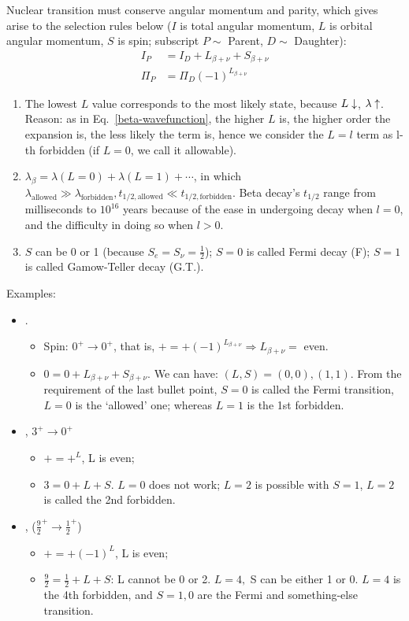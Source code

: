 \documentclass{school-22.101-notes}
\begin{document}
Nuclear transition must conserve angular momentum and parity, which gives arise to the selection rules below ($I$ is total angular momentum, $L$ is orbital angular momentum, $S$ is spin; subscript $P \sim$ Parent, $D \sim$ Daughter):
\begin{align}
I_P &= I_D + L_{\beta + \nu} + S_{\beta +\nu} \\
\Pi_P &= \Pi_D (-1)^{L_{\beta + \nu}}
\end{align}
\begin{enumerate}
\item The lowest $L$ value corresponds to the most likely state, because $L \downarrow$, $\lambda \uparrow$. Reason: as in Eq.~\ref{beta-wavefunction}, the higher $L$ is, the higher order the expansion is, the less likely the term is, hence we consider the $L=l$ term as l-th forbidden (if $L=0$, we call it allowable). 
\item $\lambda_{\beta} = \lambda (L=0) + \lambda (L=1) + \cdots$, in which $\lambda_{\mathrm{allowed}} \gg \lambda_{\mathrm{forbidden}}, t_{1/2,\mathrm{allowed}} \ll t_{1/2,\mathrm{forbidden}}$. Beta decay's $t_{1/2}$ range from milliseconds to $10^{16}$ years because of the ease in undergoing decay when $l=0$, and the difficulty in doing so when $l>0$. 
\item $S$ can be 0 or 1 (because $S_e = S_{\nu} = \frac{1}{2}$); $S = 0$ is called Fermi decay (F); $S=1$ is called Gamow-Teller decay (G.T.).
\end{enumerate}
Examples:
\begin{itemize} 
\item {}. 
    \begin{itemize} 
    \item Spin: $0^+ \to 0^+$, that is, $+ = + (-1)^{L_{\beta + \nu}} \Rightarrow L_{\beta + \nu} = $ even. 
    \item $ 0 = 0 + L_{\beta + \nu}+ S_{\beta + \nu}$. We can have: $(L, S) = (0,0), (1,1)$. From the requirement of the last bullet point, $S=0$ is called the Fermi transition, $L=0$ is the `allowed' one; whereas $L=1$ is the 1st forbidden.  
    \end{itemize}
\item {}, $3^+ \to 0^+$
    \begin{itemize}
    \item $+ = +^L$, L is even;
    \item $3 = 0 + L + S$. $L = 0$ does not work; $L = 2$ is possible with $S=1$, $L = 2$ is called the 2nd forbidden. 
    \end{itemize}
\item {}, ($\frac{9}{2}^+ \to \frac{1}{2}^+ $)
    \begin{itemize}
    \item $+ = + (-1)^L$, L is even;
    \item $\frac{9}{2} = \frac{1}{2} + L + S$: L cannot be 0 or 2. $L =4,$ S can be either 1 or 0. $L = 4$ is the 4th forbidden, and $S = 1, 0$ are the Fermi and something-else transition. 
    \end{itemize}    
\end{itemize}
\end{document}
